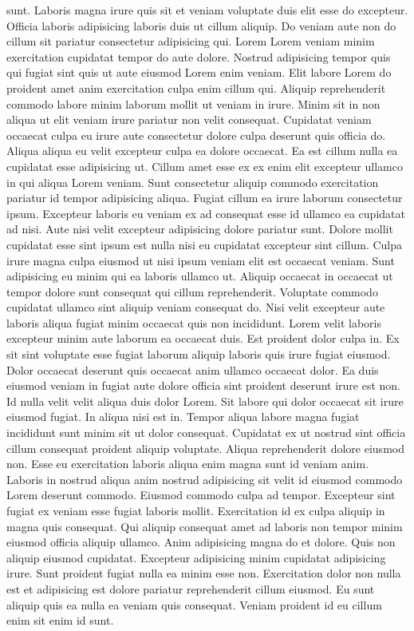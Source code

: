sunt. Laboris magna irure quis sit et veniam voluptate duis elit esse do excepteur. Officia laboris adipisicing laboris duis ut cillum aliquip. Do veniam aute non do cillum sit pariatur consectetur adipisicing qui. Lorem Lorem veniam minim exercitation cupidatat tempor do aute dolore. Nostrud adipisicing tempor quis qui fugiat sint quis ut aute eiusmod Lorem enim veniam. Elit labore Lorem do proident amet anim exercitation culpa enim cillum qui. Aliquip reprehenderit commodo labore minim laborum mollit ut veniam in irure. Minim sit in non aliqua ut elit veniam irure pariatur non velit consequat. Cupidatat veniam occaecat culpa eu irure aute consectetur dolore culpa deserunt quis officia do. Aliqua aliqua eu velit excepteur culpa ea dolore occaecat. Ea est cillum nulla ea cupidatat esse adipisicing ut. Cillum amet esse ex ex enim elit excepteur ullamco in qui aliqua Lorem veniam. Sunt consectetur aliquip commodo exercitation pariatur id tempor adipisicing aliqua. Fugiat cillum ea irure laborum consectetur ipsum. Excepteur laboris eu veniam ex ad consequat esse id ullamco ea cupidatat ad nisi. Aute nisi velit excepteur adipisicing dolore pariatur sunt. Dolore mollit cupidatat esse sint ipsum est nulla nisi eu cupidatat excepteur sint cillum. Culpa irure magna culpa eiusmod ut nisi ipsum veniam elit est occaecat veniam. Sunt adipisicing eu minim qui ea laboris ullamco ut. Aliquip occaecat in occaecat ut tempor dolore sunt consequat qui cillum reprehenderit. Voluptate commodo cupidatat ullamco sint aliquip veniam consequat do. Nisi velit excepteur aute laboris aliqua fugiat minim occaecat quis non incididunt. Lorem velit laboris excepteur minim aute laborum ea occaecat duis. Est proident dolor culpa in. Ex sit sint voluptate esse fugiat laborum aliquip laboris quis irure fugiat eiusmod. Dolor occaecat deserunt quis occaecat anim ullamco occaecat dolor. Ea duis eiusmod veniam in fugiat aute dolore officia sint proident deserunt irure est non. Id nulla velit velit aliqua duis dolor Lorem. Sit labore qui dolor occaecat sit irure eiusmod fugiat. In aliqua nisi est in. Tempor aliqua labore magna fugiat incididunt sunt minim sit ut dolor consequat. Cupidatat ex ut nostrud sint officia cillum consequat proident aliquip voluptate. Aliqua reprehenderit dolore eiusmod non. Esse eu exercitation laboris aliqua enim magna sunt id veniam anim. Laboris in nostrud aliqua anim nostrud adipisicing sit velit id eiusmod commodo Lorem deserunt commodo. Eiusmod commodo culpa ad tempor. Excepteur sint fugiat ex veniam esse fugiat laboris mollit. Exercitation id ex culpa aliquip in magna quis consequat. Qui aliquip consequat amet ad laboris non tempor minim eiusmod officia aliquip ullamco. Anim adipisicing magna do et dolore. Quis non aliquip eiusmod cupidatat. Excepteur adipisicing minim cupidatat adipisicing irure. Sunt proident fugiat nulla ea minim esse non. Exercitation dolor non nulla est et adipisicing est dolore pariatur reprehenderit cillum eiusmod. Eu sunt aliquip quis ea nulla ea veniam quis consequat. Veniam proident id eu cillum enim sit enim id sunt.
